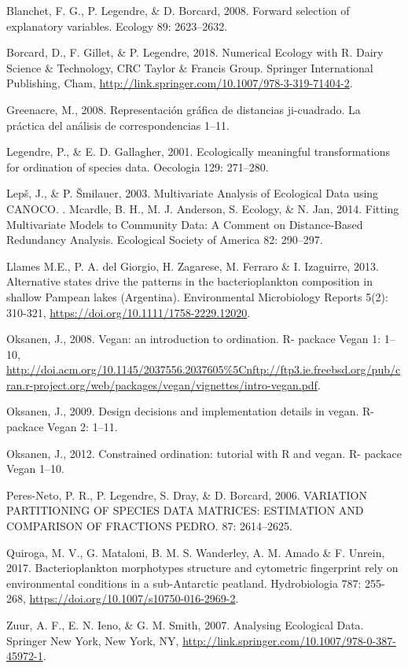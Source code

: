 \documentclass[
]{book}
\begin{document}
Blanchet, F. G., P. Legendre, \& D. Borcard, 2008. Forward selection of explanatory variables. Ecology 89: 2623--2632.

Borcard, D., F. Gillet, \& P. Legendre, 2018. Numerical Ecology with R. Dairy Science \& Technology, CRC Taylor \& Francis Group. Springer International Publishing, Cham, \url{http://link.springer.com/10.1007/978-3-319-71404-2}.

Greenacre, M., 2008. Representación gráfica de distancias ji-cuadrado. La práctica del análisis de correspondencias 1--11.

Legendre, P., \& E. D. Gallagher, 2001. Ecologically meaningful transformations for ordination of species data. Oecologia 129: 271--280.

Lepš, J., \& P. Šmilauer, 2003. Multivariate Analysis of Ecological Data using CANOCO. .
Mcardle, B. H., M. J. Anderson, S. Ecology, \& N. Jan, 2014. Fitting Multivariate Models to Community Data: A Comment on Distance-Based Redundancy Analysis. Ecological Society of America 82: 290--297.

Llames M.E., P. A. del Giorgio, H. Zagarese, M. Ferraro \& I. Izaguirre, 2013. Alternative states drive the patterns in the bacterioplankton composition in shallow Pampean lakes (Argentina). Environmental Microbiology Reports 5(2): 310-321, \url{https://doi.org/10.1111/1758-2229.12020}.

Oksanen, J., 2008. Vegan: an introduction to ordination. R- packace Vegan 1: 1--10, \url{http://doi.acm.org/10.1145/2037556.2037605\%5Cnftp://ftp3.ie.freebsd.org/pub/cran.r-project.org/web/packages/vegan/vignettes/intro-vegan.pdf}.

Oksanen, J., 2009. Design decisions and implementation details in vegan. R- packace Vegan 2: 1--11.

Oksanen, J., 2012. Constrained ordination: tutorial with R and vegan. R- packace Vegan 1--10.

Peres-Neto, P. R., P. Legendre, S. Dray, \& D. Borcard, 2006. VARIATION PARTITIONING OF SPECIES DATA MATRICES: ESTIMATION AND COMPARISON OF FRACTIONS PEDRO. 87: 2614--2625.

Quiroga, M. V., G. Mataloni, B. M. S. Wanderley, A. M. Amado \& F. Unrein, 2017. Bacterioplankton morphotypes structure and cytometric fingerprint rely on environmental conditions in a sub-Antarctic peatland. Hydrobiologia 787: 255-268, \url{https://doi.org/10.1007/s10750-016-2969-2}.

Zuur, A. F., E. N. Ieno, \& G. M. Smith, 2007. Analysing Ecological Data. Springer New York, New York, NY, \url{http://link.springer.com/10.1007/978-0-387-45972-1}.
\end{document}
